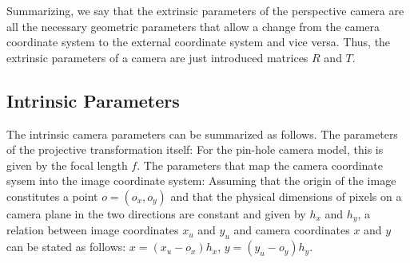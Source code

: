 \documentclass[conference]{IEEEtran}
\begin{document}
Summarizing, we say that the extrinsic parameters of the perspective camera are all the necessary geometric parameters that allow a change from the camera coordinate system to the external coordinate system and vice versa. Thus, the extrinsic parameters of a camera are just introduced matrices $R$ and $T$. 

\subsection*{Intrinsic Parameters}
The intrinsic camera parameters can be summarized as follows. The parameters of the projective transformation itself: For the pin-hole camera model, this is given by the focal length $f$. The parameters that map the camera coordinate sysem into the image coordinate system: Assuming that the origin of the image constitutes a point $o = (o_x, o_y)$ and that the physical dimensions of pixels on a camera plane in the two directions are constant and given by $h_x$ and $h_y$, a relation between image coordinates $x_u$ and $y_u$ and camera coordinates $x$ and $y$ can be stated as follows: $x = (x_u - o_x)h_x$, $y = (y_u - o_y)h_y$.





\end{document}
